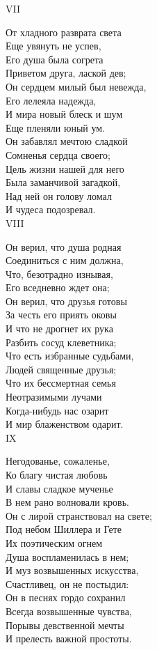 VII

От хладного разврата света\\
Еще увянуть не успев,\\
Его душа была согрета\\
Приветом друга, лаской дев;\\
Он сердцем милый был невежда,\\
Его лелеяла надежда,\\
И мира новый блеск и шум\\
Еще пленяли юный ум.\\
Он забавлял мечтою сладкой\\
Сомненья сердца своего;\\
Цель жизни нашей для него\\
Была заманчивой загадкой,\\
Над ней он голову ломал\\
И чудеса подозревал.\\

VIII

Он верил, что душа родная\\
Соединиться с ним должна,\\
Что, безотрадно изнывая,\\
Его вседневно ждет она;\\
Он верил, что друзья готовы\\
За честь его приять оковы\\
И что не дрогнет их рука\\
Разбить сосуд клеветника;\\
Что есть избранные судьбами,\\
Людей священные друзья;\\
Что их бессмертная семья\\
Неотразимыми лучами\\
Когда-нибудь нас озарит\\
И мир блаженством одарит.\\

IX

Негодованье, сожаленье,\\
Ко благу чистая любовь\\
И славы сладкое мученье\\
В нем рано волновали кровь.\\
Он с лирой странствовал на свете;\\
Под небом Шиллера и Гете\\
Их поэтическим огнем\\
Душа воспламенилась в нем;\\
И муз возвышенных искусства,\\
Счастливец, он не постыдил:\\
Он в песнях гордо сохранил\\
Всегда возвышенные чувства,\\
Порывы девственной мечты\\
И прелесть важной простоты.\\

